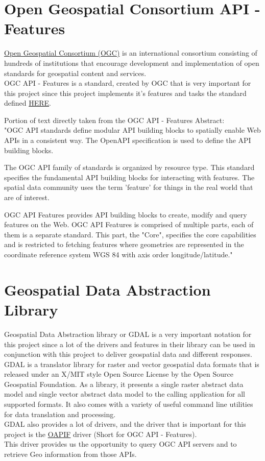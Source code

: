 \section{Open Geospatial Consortium API - Features}
\href{https://www.opengeospatial.org/}{Open Geospatial Consortium (OGC)} is an international consortium consisting of hundreds of institutions that encourage development and implementation of open standards for geospatial content and services.\\
OGC API - Features is a standard, created by OGC that is very important for this project since this project implements it's features and tasks the standard defined \href{https://docs.opengeospatial.org/is/17-069r3/17-069r3.html}{HERE}.

Portion of text directly taken from the OGC API - Features Abstract:  \cite{OGCApiFeatures}\\
"OGC API standards define modular API building blocks to spatially enable Web APIs in a consistent way. The OpenAPI specification is used to define the API building blocks.

The OGC API family of standards is organized by resource type. This standard specifies the fundamental API building blocks for interacting with features. The spatial data community uses the term 'feature' for things in the real world that are of interest.

OGC API Features provides API building blocks to create, modify and query features on the Web. OGC API Features is comprised of multiple parts, each of them is a separate standard. This part, the "Core", specifies the core capabilities and is restricted to fetching features where geometries are represented in the coordinate reference system WGS 84 with axis order longitude/latitude." \cite{OGCApiFeatures}

\section{Geospatial Data Abstraction Library}
Geospatial Data Abstraction library or GDAL is a very important notation for this project since a lot of the drivers and features in their library can be used in conjunction with this project to deliver geospatial data and different responses.\\
\newline
GDAL is a translator library for raster and vector geospatial data formats that is released under an X/MIT style Open Source License by the Open Source Geospatial Foundation. As a library, it presents a single raster abstract data model and single vector abstract data model to the calling application for all supported formats. It also comes with a variety of useful command line utilities for data translation and processing. \cite{WhatIsGDAL}\\
GDAL also provides a lot of drivers, and the driver that is important for this project is the \href{https://gdal.org/drivers/vector/oapif.html}{OAPIF} driver (Short for OGC API - Features).\\
This driver provides us the opportunity to query OGC API servers and to retrieve Geo information from those APIs.

